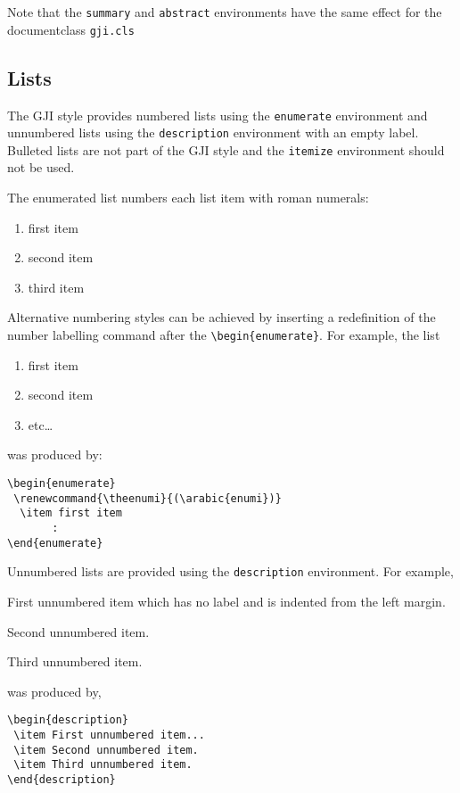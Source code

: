 \documentclass{gji}
\begin{document}
Note that the \verb"summary" and \verb"abstract" environments have the same
effect for the documentclass \verb"gji.cls"

\subsection{Lists}

The GJI style provides numbered lists using the \verb"enumerate"
environment and unnumbered lists using the \verb"description"
environment with an empty label. Bulleted lists are not part of the GJI
style and the \verb"itemize" environment should not be used.

The enumerated list numbers each list item with roman numerals:
\begin{enumerate}
  \item first item
  \item second item
  \item third item
\end{enumerate}
Alternative numbering styles can be achieved by inserting a
redefinition of the number labelling command after the
\verb"\begin{enumerate}". For example, the list
\begin{enumerate}
\renewcommand{\theenumi}{(\arabic{enumi})}
  \item first item
  \item second item
  \item etc\ldots
\end{enumerate}
was produced by:
\begin{verbatim}
\begin{enumerate}
 \renewcommand{\theenumi}{(\arabic{enumi})}
  \item first item
       :
\end{enumerate}
\end{verbatim}
Unnumbered lists are provided using the \verb"description" environment.
For example,
\begin{description}
  \item First unnumbered item which has no label and is indented from
        the left margin.
  \item Second unnumbered item.
  \item Third unnumbered item.
\end{description}
was produced by,
\begin{verbatim}
\begin{description}
 \item First unnumbered item...
 \item Second unnumbered item.
 \item Third unnumbered item.
\end{description}
\end{verbatim}
\end{document}
